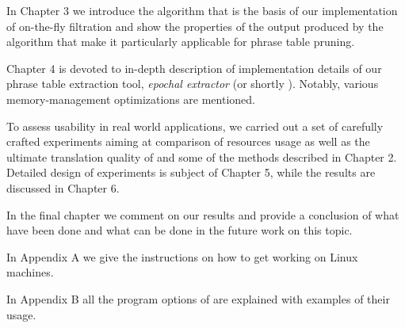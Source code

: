 In Chapter 3 we introduce the algorithm that is the basis of our implementation
of on-the-fly filtration and show the properties of the output produced
by the algorithm that make it particularly applicable for phrase table pruning.

Chapter 4 is devoted to in-depth description of implementation details of our
phrase table extraction tool, \emph{epochal extractor} (or shortly \eppex{}).
Notably, various memory-management optimizations are mentioned.

To assess \eppex{} usability in real world applications, we carried out a set
of carefully crafted experiments aiming at comparison of resources usage as well as
the ultimate translation quality of \eppex{} and some of the methods described
in Chapter 2.
Detailed design of experiments is subject of Chapter 5,
while the results are discussed in Chapter 6.

In the final chapter we comment on our results and provide a conclusion of
what have been done and what can be done in the future work on this topic.

In Appendix A we give the instructions on how to get \eppex{} working on Linux machines.

In Appendix B all the program options of \eppex{} are explained with examples of their usage.
